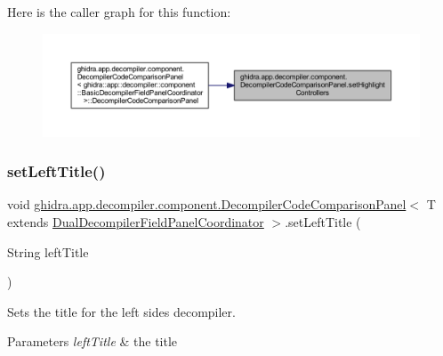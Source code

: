 Here is the caller graph for this function\+:
\nopagebreak
\begin{figure}[H]
\begin{center}
\leavevmode
\includegraphics[width=350pt]{classghidra_1_1app_1_1decompiler_1_1component_1_1_decompiler_code_comparison_panel_a1504b8e552aff24d2870261c52ef478a_icgraph}
\end{center}
\end{figure}
\mbox{\label{classghidra_1_1app_1_1decompiler_1_1component_1_1_decompiler_code_comparison_panel_ac1eaddf2fa31e5b5e66e617aa37a82fb}} 
\subsubsection{\texorpdfstring{setLeftTitle()}{setLeftTitle()}}
{\footnotesize\ttfamily void \mbox{\hyperlink{classghidra_1_1app_1_1decompiler_1_1component_1_1_decompiler_code_comparison_panel}{ghidra.\+app.\+decompiler.\+component.\+Decompiler\+Code\+Comparison\+Panel}}$<$ T extends \mbox{\hyperlink{classghidra_1_1app_1_1decompiler_1_1component_1_1_dual_decompiler_field_panel_coordinator}{Dual\+Decompiler\+Field\+Panel\+Coordinator}} $>$.set\+Left\+Title (\begin{DoxyParamCaption}\item[{String}]{left\+Title }\end{DoxyParamCaption})\hspace{0.3cm}{\ttfamily [inline]}}

Sets the title for the left side\textquotesingle{}s decompiler. 
\begin{DoxyParams}{Parameters}
{\em left\+Title} & the title \\
\hline
\end{DoxyParams}


